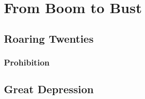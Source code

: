 \chapter{From Boom to Bust}

\section{Roaring Twenties}

\subsection*{Prohibition}

\section{Great Depression}
